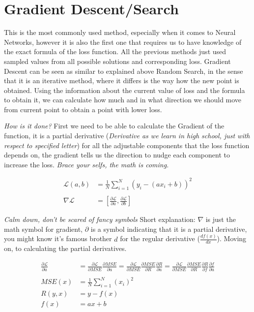 \documentclass{article}
\begin{document}
\section{Gradient Descent/Search}

This is the most commonly used method, especially when it comes to Neural Networks, however it is also the first one that requires us to have knowledge of the exact formula of the loss function. All the previous methods just used sampled values from all possible solutions and corresponding loss. Gradient Descent can be seen as similar to explained above Random Search, in the sense that it is an iterative method, where it differs is the way how the new point is obtained. Using the information about the current value of loss and the formula to obtain it, we can calculate how much and in what direction we should move from current point to obtain a point with lower loss.

\textit{How is it done?} First we need to be able to calculate the Gradient of the function, it is a partial derivative (\textit{Derivative as we learn in high school, just with respect to specified letter}) for all the adjustable components that the loss function depends on, the gradient tells us the direction to nudge each component to increase the loss. \textit{Brace your selfs, the math is coming.}

\begin{align*}
    \mathcal{L}(a,b) &= \frac{1}{N}\sum_{i=1}^N{(y_i - (ax_i + b))^2}\\\\
    \nabla\mathcal{L} &= \left[\frac{\partial \mathcal L}{\partial a}, \frac{\partial \mathcal L}{\partial b}\right]
\end{align*}

\textit{Calm down, don't be scared of fancy symbols} Short explanation: $\nabla$ is just the math symbol for gradient, $\partial$ is a symbol indicating that it is a partial derivative, you might know it's famous brother $d$ for the regular derivative ($\frac{df(x)}{dx}$). Moving on, to calculating the partial derivatives.

\begin{align*}
    \frac{\partial\mathcal L}{\partial a} &= \frac{\partial\mathcal L}{\partial MSE} \frac{\partial MSE}{\partial a} = \frac{\partial\mathcal L}{\partial MSE} \frac{\partial MSE}{\partial R}\frac{\partial R}{\partial a} = \frac{\partial\mathcal L}{\partial MSE} \frac{\partial MSE}{\partial R}\frac{\partial R}{\partial f} \frac{\partial f}{\partial a} \\\\
    MSE(x) &= \frac{1}{N}\sum^N_{i=1}(x_i)^2 \\
    R(y, x) &= y - f(x) \\
    f(x) &= ax + b
\end{align*}
\end{document}
